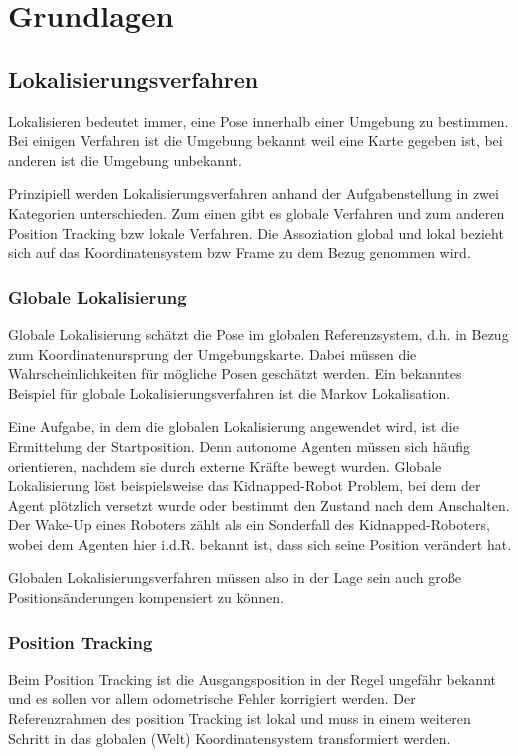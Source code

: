 \chapter{Grundlagen}
\label{ch:basics}

\section{Lokalisierungsverfahren}

Lokalisieren bedeutet immer, eine Pose innerhalb einer Umgebung zu bestimmen. Bei einigen Verfahren ist die Umgebung bekannt weil eine Karte gegeben ist, bei anderen ist die Umgebung unbekannt.
\newline

Prinzipiell werden Lokalisierungsverfahren anhand der Aufgabenstellung in zwei Kategorien unterschieden. Zum einen gibt es globale Verfahren und zum anderen Position Tracking bzw lokale Verfahren. Die Assoziation global und lokal bezieht sich auf das Koordinatensystem bzw Frame zu dem Bezug genommen wird.

\subsection{Globale Lokalisierung}

Globale Lokalisierung schätzt die Pose im globalen Referenzsystem, d.h. in Bezug zum Koordinatenursprung der Umgebungskarte. Dabei müssen die Wahrscheinlichkeiten für mögliche Posen geschätzt werden. Ein bekanntes Beispiel für globale Lokalisierungsverfahren ist die Markov Lokalisation.
\newline

Eine Aufgabe, in dem die globalen Lokalisierung angewendet wird, ist die Ermittelung der Startposition. Denn autonome Agenten müssen sich häufig orientieren, nachdem sie durch externe Kräfte bewegt wurden. Globale Lokalisierung löst beispielsweise das Kidnapped-Robot Problem, bei dem der Agent plötzlich versetzt wurde oder bestimmt den Zustand nach dem Anschalten. Der Wake-Up eines Roboters zählt als ein Sonderfall des Kidnapped-Roboters, wobei dem Agenten hier i.d.R. bekannt ist, dass sich seine Position verändert hat.
\newline

Globalen Lokalisierungsverfahren müssen also in der Lage sein auch gro{\ss}e Positionsänderungen kompensiert zu können. \cite{locFox}


\subsection{Position Tracking}
Beim Position Tracking ist die Ausgangsposition in der Regel ungefähr bekannt und es sollen vor allem odometrische Fehler korrigiert werden. Der Referenzrahmen des position Tracking ist lokal und muss in einem weiteren Schritt in das globalen (Welt) Koordinatensystem transformiert werden. 
\newline

